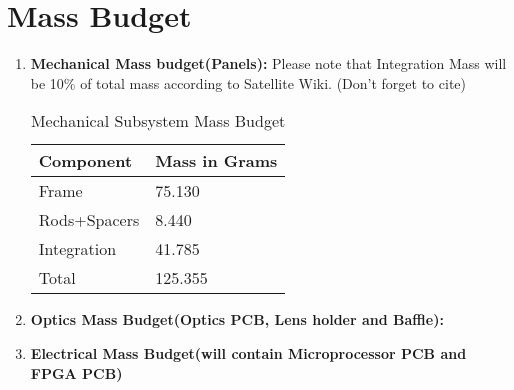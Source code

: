 \documentclass[../../main.tex]{subfiles}
\begin{document}
\section{Mass Budget}
\begin{enumerate}
    \item \textbf{Mechanical Mass budget(Panels):}
    \text Please note that Integration Mass will be 10\% of total mass according to Satellite Wiki. (Don't forget to cite)
    \begin{table}[h!]
        \centering
        \begin{tabular}{|p{3cm}|p{4cm}|}
             \hline
             \textbf{Component} & \textbf{Mass in Grams}  \\
             \hline
              Frame & 75.130\\
             \hline
             Rods+Spacers & 8.440 \\
             \hline
             Integration & 41.785 \\
             \hline
             Total & 125.355 \\
             \hline
        \end{tabular}
        \caption{Mechanical Subsystem Mass Budget}
        \label{tab:my_label}
    \end{table}
    \item \textbf{Optics Mass Budget(Optics PCB, Lens holder and Baffle):}
    \item \textbf{Electrical Mass Budget(will contain Microprocessor PCB and FPGA PCB)}
\end{enumerate}
\end{document}
